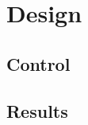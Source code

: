 \part{Design}
\label{design}

\chapter{Control}
\label{control}


\chapter{Results}
\label{results}

